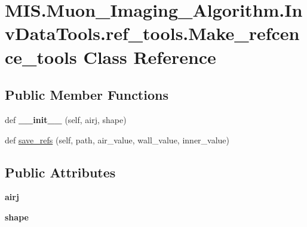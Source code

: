 \hypertarget{classMIS_1_1Muon__Imaging__Algorithm_1_1InvDataTools_1_1ref__tools_1_1Make__refcence__tools}{}\section{M\+I\+S.\+Muon\+\_\+\+Imaging\+\_\+\+Algorithm.\+Inv\+Data\+Tools.\+ref\+\_\+tools.\+Make\+\_\+refcence\+\_\+tools Class Reference}
\label{classMIS_1_1Muon__Imaging__Algorithm_1_1InvDataTools_1_1ref__tools_1_1Make__refcence__tools}
\subsection*{Public Member Functions}
\begin{DoxyCompactItemize}
\item 
\mbox{\label{classMIS_1_1Muon__Imaging__Algorithm_1_1InvDataTools_1_1ref__tools_1_1Make__refcence__tools_a1d44d889856597485bbf272eefb50f0d}} 
def {\bfseries \+\_\+\+\_\+init\+\_\+\+\_\+} (self, airj, shape)
\item 
def \hyperlink{classMIS_1_1Muon__Imaging__Algorithm_1_1InvDataTools_1_1ref__tools_1_1Make__refcence__tools_a31d6684a74cc5a456dc109a2b04edf0a}{save\+\_\+refs} (self, path, air\+\_\+value, wall\+\_\+value, inner\+\_\+value)
\end{DoxyCompactItemize}
\subsection*{Public Attributes}
\begin{DoxyCompactItemize}
\item 
\mbox{\label{classMIS_1_1Muon__Imaging__Algorithm_1_1InvDataTools_1_1ref__tools_1_1Make__refcence__tools_ad43f1da4b592e2cd198301ac36acfe27}} 
{\bfseries airj}
\item 
\mbox{\label{classMIS_1_1Muon__Imaging__Algorithm_1_1InvDataTools_1_1ref__tools_1_1Make__refcence__tools_ae5a25ee2adbdb96225dec7ea9d37d68b}} 
{\bfseries shape}
\end{DoxyCompactItemize}


